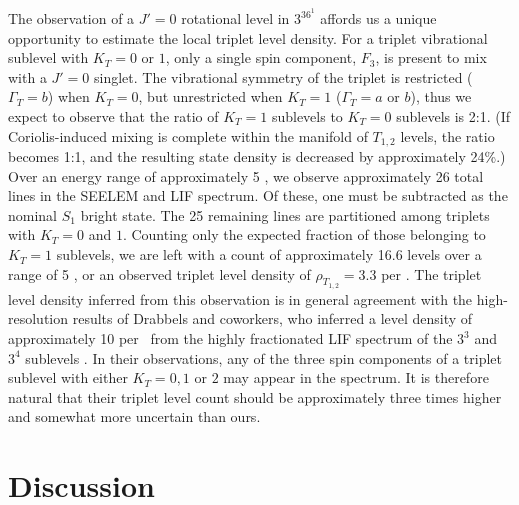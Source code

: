 \documentclass[12pt]{mitthesis}
\begin{document}
The observation of a $J'=0$ rotational level in $3^36^1$ 
affords us a unique opportunity to estimate the local triplet level
density.  For a triplet vibrational sublevel with $K_T=0$ or $1$, only
a single spin component, $F_3$, is present to mix with a $J'=0$
singlet.  The vibrational symmetry of the triplet is restricted
($\Gamma_T=b$) when $K_T=0$, but unrestricted when $K_T=1$
($\Gamma_T=a$ or $b$), thus we expect to observe that the ratio of
$K_T=1$ sublevels to $K_T=0$ sublevels is 2:1.  (If Coriolis-induced
mixing is complete within the manifold of $T_{1,2}$ levels, the ratio
becomes 1:1, and the resulting state density is decreased by
approximately 24\%.)  Over an energy range of approximately 5 \rcm, we
observe approximately 26 total lines in the SEELEM and LIF spectrum.
Of these, one must be subtracted as the nominal $S_1$ bright state.
The 25 remaining lines are partitioned among triplets with $K_T=0$ and
$1$.  Counting only the expected fraction of those belonging to
$K_T=1$ sublevels, we are left with a count of approximately 16.6
levels over a range of 5 \rcm, or an observed triplet level density of
$\rho_{T_{1,2}} = 3.3$ per \rcm.  The triplet level density inferred
from this observation is in general agreement with the high-resolution
results of Drabbels and coworkers, who inferred a level density of
approximately 10 per \rcm\ from the highly fractionated LIF spectrum of
the $3^3$  and $3^4$  sublevels \cite{drabbels94}.  In
their observations, any of the three spin components of a triplet
sublevel with either $K_T=0, 1$ or $2$ may appear in the spectrum.  It
is therefore natural that their triplet level count should be
approximately three times higher and somewhat more uncertain than
ours.



\section{Discussion}

\end{document}
